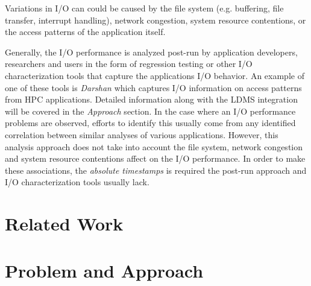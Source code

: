 \documentclass[conference]{IEEEtran}
\begin{document}
Variations in I/O can could be caused by the file system (e.g. buffering, file transfer, interrupt handling), network congestion, system resource contentions, or the access patterns of the application itself.

Generally, the I/O performance is analyzed post-run by application developers, researchers and users in the form of regression testing or other I/O characterization tools that capture the applications I/O behavior. An example of one of these tools is \emph{Darshan} which captures I/O information on access patterns from HPC applications. Detailed information along with the LDMS integration will be covered in the \emph{Approach} section. In the case where an I/O performance problems are observed, efforts to identify this usually come from any identified correlation between similar analyses of various applications. However, this analysis approach does not take into account the file system, network congestion and system resource contentions affect on the I/O performance. In order to make these associations, the \emph{absolute timestamps} is required the post-run approach and I/O characterization tools usually lack.






\section{Related Work}

\section{Problem and Approach}
\end{document}
